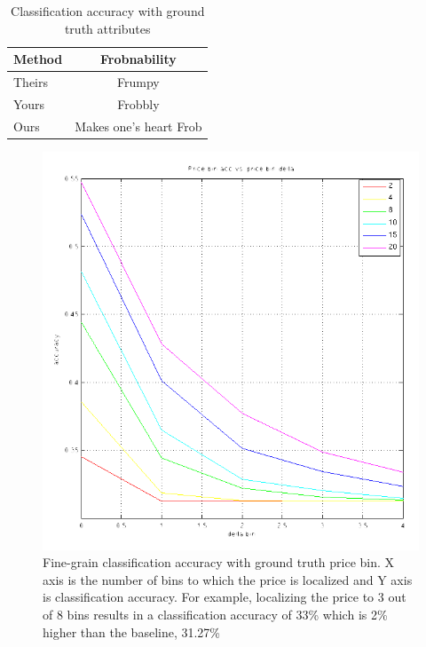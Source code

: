 \documentclass[10pt,twocolumn,letterpaper]{article}
\begin{document}
\begin{table}
\begin{center}
\begin{tabular}{|l|c|}
\hline
Method & Frobnability \\
\hline\hline
Theirs & Frumpy \\
Yours & Frobbly \\
Ours & Makes one's heart Frob\\
\hline
\end{tabular}
\end{center}
\caption{Classification accuracy with ground truth attributes}
\label{table:car-att}
\end{table}

\begin{figure}[t]
\begin{center}
\includegraphics[width=0.9\linewidth]{img/price-att.png}
\end{center}
   \caption{Fine-grain classification accuracy with ground truth price bin. X axis is the number of bins to which the price is localized and Y axis is classification accuracy. For example, localizing the price to 3 out of 8 bins results in a classification accuracy of 33\% which is 2\% higher than the baseline, 31.27\%}
\label{fig:price-acc}
\end{figure}
\end{document}
